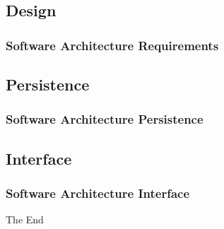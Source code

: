 \documentclass{beamer}
\begin{document}
	\subsection{Design}
		\begin{frame}
		\frametitle{Software Architecture Requirements}
		
		\end{frame}
		
	\subsection{Persistence}
		\begin{frame}
		\frametitle{Software Architecture Persistence}
		
		\end{frame}
		
	\subsection{Interface}
		\begin{frame}
		\frametitle{Software Architecture Interface}
		
		\end{frame}

\begin{frame}
	\Huge{\centerline{The End}}
\end{frame}
\end{document}

